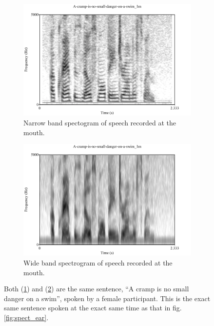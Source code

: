 \documentclass[dissertation,copyright]{uathesis}
\begin{document}
\begin{figure}
\centering
\begin{subfigure}{.475\textwidth}
  \centering
  \includegraphics[width=1\linewidth]{figure/spctgrmNarrowMouth_35.pdf}
  \caption{Narrow band spectogram of speech recorded at the mouth.}
  \label{spctgrmNarrowMouth_35}
\end{subfigure}%
\hfill
\begin{subfigure}{.475\textwidth}
  \centering
  \includegraphics[width=1\linewidth]{figure/spctgrmWideMouth_35.pdf}
  \caption{Wide band spectrogram of speech recorded at the mouth.}
  \label{spctgrmWideMouth_35}
\end{subfigure}
\caption{Both (\ref{spctgrmNarrowMouth_35}) and (\ref{spctgrmWideMouth_35}) are the same sentence, ``A cramp is no small danger on a swim'', spoken by a female participant. This is the exact same sentence spoken at the exact same time as that in fig. \ref{fig:spect_ear}.}
\label{fig:spect_mouth}
\end{figure}
\end{document}
